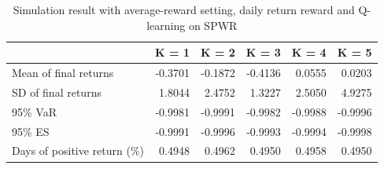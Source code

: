 \documentclass{article}
\begin{document}
\begin{table}[H]
\centering
\begin{tabular}{|l|r|r|r|r|r|} 
\hline
                             & \multicolumn{1}{l|}{K = 1} & \multicolumn{1}{l|}{K = 2} & \multicolumn{1}{l|}{K = 3} & \multicolumn{1}{l|}{K = 4} & \multicolumn{1}{l|}{K = 5}  \\ 
\hline
Mean of final returns        & -0.3701                    & -0.1872                    & -0.4136                    & 0.0555                     & 0.0203                      \\ 
\hline
SD of final returns          & 1.8044                     & 2.4752                     & 1.3227                     & 2.5050                     & 4.9275                      \\ 
\hline
95\% VaR                     & -0.9981                    & -0.9991                    & -0.9982                    & -0.9988                    & -0.9996                     \\ 
\hline
95\% ES                      & -0.9991                    & -0.9996                    & -0.9993                    & -0.9994                    & -0.9998                     \\ 
\hline
Days of positive return (\%) & 0.4948                     & 0.4962                     & 0.4950                     & 0.4958                     & 0.4950                      \\
\hline
\end{tabular}
\caption{Simulation result with average-reward setting, daily return reward and Q-learning on SPWR}
\label{table12}
\end{table}
\end{document}
